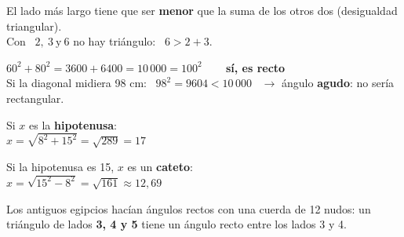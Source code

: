 \documentclass[11pt,a4paper]{article}
\newcommand{\heavy}{\fontseries{eb}\selectfont}
\newcommand{\be}[1]{{\color{fmok}\faCheckCircle}\ \ensuremath{#1}}
\newcommand{\mal}[1]{{\color{fmR}\faTimesCircle}\ {\color{fmR}\ensuremath{#1}}}
\begin{document}
\vfill
\begin{compte}
El lado más largo tiene que ser \textbf{menor} que la suma de los otros dos (desigualdad triangular).\\[3pt] Con \mal{2,\ 3\ \text{y}\ 6} no hay triángulo: \ $6>2+3$.
\end{compte}

\vfill
\begin{exemple}
\begin{minipage}[c]{0.6\linewidth}
$60^2+80^2=3600+6400=10\,000=100^2$ \ \be{} \ \textbf{sí, es recto}\\[4pt]
Si la diagonal midiera 98 cm: \ $98^2=9604<10\,000$ \ $\to$ ángulo \textbf{agudo}: no sería rectangular.
\end{minipage}\hfill
\begin{minipage}[c]{0.36\linewidth}\centering
{}
\end{minipage}
\end{exemple}

\vfill
\begin{exemple}
\begin{minipage}[t]{0.5\linewidth}
Si $x$ es la \textbf{hipotenusa}:\\[2pt]
$x=\sqrt{8^2+15^2}=\sqrt{289}=\boxed{17}$
\end{minipage}\hfill
\begin{minipage}[t]{0.47\linewidth}
Si la hipotenusa es 15, $x$ es un \textbf{cateto}:\\[2pt]
$x=\sqrt{15^2-8^2}=\sqrt{161}\approx\boxed{12{,}69}$
\end{minipage}
\end{exemple}

\vfill
\begin{truc}
Los antiguos egipcios hacían ángulos rectos con una cuerda de 12 nudos: un triángulo de lados \textbf{3, 4 y 5} tiene un ángulo recto entre los lados 3 y 4.
\end{truc}
\end{document}
